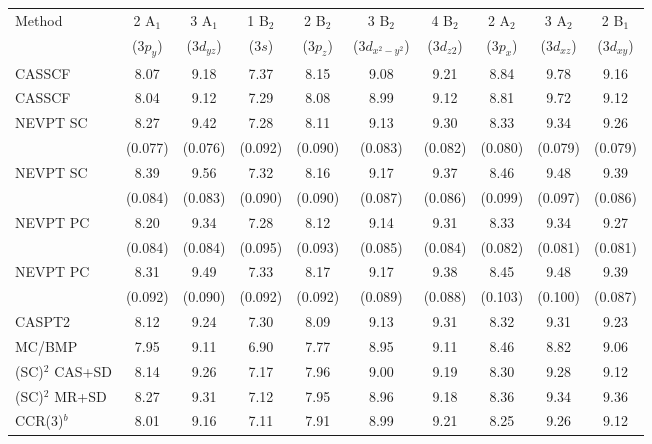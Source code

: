 \begin{center}
\begin{threeparttable}
\tiny
\begin{tabular}{lccccccccc}
\hline
Method &2 A$_1$ & 3 A$_1$ & 1 B$_2$ & 2 B$_2$ & 3 B$_2$ & 4 B$_2$ & 2 A$_2$ & 3 A$_2$ &  2 B$_1$ \\
 &($3p_y$) & ($3d_{yz}$) & ($3s$) & ($3p_z$) & 
($3d_{x^2\!-\!y^2}$) & ($3d_{z2}$) & ($3p_x$) &
($3d_{xz}$) & ($3d_{xy}$)     \\
\hline
CASSCF\tnote{a,b}  &   8.07 & 9.18  & 7.37  & 8.15  & 9.08  & 9.21  & 8.84  & 9.78  & 9.16 \\
CASSCF\tnote{a,c}  &   8.04 & 9.12  & 7.29  & 8.08  & 8.99  & 9.12  & 8.81  & 9.72  & 9.12 \\
NEVPT SC\tnote{a,b}&   8.27 & 9.42  & 7.28  & 8.11  & 9.13  & 9.30  & 8.33  & 9.34  & 9.26 \\
                & (0.077)&(0.076)&(0.092)&(0.090)&(0.083)&(0.082)&(0.080)&(0.079)&(0.079)\\
NEVPT SC\tnote{a,c}&   8.39 & 9.56  & 7.32  & 8.16  & 9.17  & 9.37  & 8.46  & 9.48  & 9.39 \\
                & (0.084)&(0.083)&(0.090)&(0.090)&(0.087)&(0.086)&(0.099)&(0.097)&(0.086)\\
NEVPT PC\tnote{a,b}&   8.20 & 9.34  & 7.28  & 8.12  & 9.14  & 9.31  & 8.33  & 9.34  & 9.27 \\
                & (0.084)&(0.084)&(0.095)&(0.093)&(0.085)&(0.084)&(0.082)&(0.081)&(0.081)\\
NEVPT PC\tnote{a,c}&   8.31 & 9.49  & 7.33  & 8.17  & 9.17  & 9.38  & 8.45  & 9.48  & 9.39 \\
                & (0.092)&(0.090)&(0.092)&(0.092)&(0.089)&(0.088)&(0.103)&(0.100)&(0.087)\\
CASPT2 \cite{tca-92-227-1995}
                &   8.12 & 9.24  & 7.30  & 8.09  & 9.13  & 9.31  & 8.32  & 9.31  & 9.23 \\
MC/BMP \cite{cp-205-323-1996}
                &   7.95 & 9.11  & 6.90  & 7.77  & 8.95  & 9.11  & 8.46  & 8.82  & 9.06 \\
(SC)$^2$ CAS+SD\tnote{b} \cite{mp-101-483-2003}
                &   8.14 & 9.26  & 7.17  & 7.96  & 9.00  & 9.19  & 8.30  & 9.28  & 9.12 \\
(SC)$^2$ MR+SD\tnote{c} \cite{mp-101-483-2003}
                &   8.27 & 9.31  & 7.12  & 7.95  & 8.96  & 9.18  & 8.36  & 9.34  & 9.36 \\
CCR(3)$^b$ \cite{mp-101-483-2003}
               &    8.01 & 9.16  & 7.11  & 7.91  & 8.99  & 9.21  & 8.25  & 9.26  & 9.12 \\

\end{tabular}
\end{threeparttable}
\end{center}
